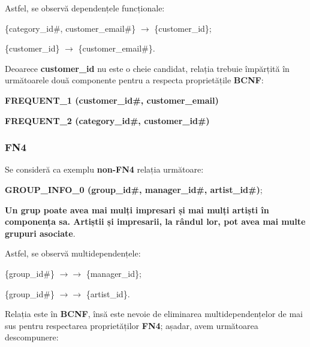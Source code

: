 \documentclass[a4paper, oneside, 12pt]{article}
\begin{document}
Astfel, se observă dependențele funcționale:

\begin{m_itemize}
        \item \{category\_id\#, customer\_email\#\} $\rightarrow$ \{customer\_id\};
        \item \{customer\_id\} $\rightarrow$ \{customer\_email\#\}.
\end{m_itemize}

Deoarece \textbf{customer\_id} nu este o cheie candidat, relația trebuie
împărțită în următoarele două componente pentru a respecta proprietățile
\textbf{BCNF}:

\begin{m_itemize}
        \item \textbf{FREQUENT\_1 (customer\_id\#, customer\_email)}
        \item \textbf{FREQUENT\_2 (category\_id\#, customer\_id\#)}
\end{m_itemize}

\subsubsection{\textbf{FN4}}

Se consideră ca exemplu \textbf{non-FN4} relația următoare:

\begin{m_itemize}[after=]
        \item \textbf{GROUP\_INFO\_0 (group\_id\#, manager\_id\#, artist\_id\#)};
        \item \textbf{Un grup poate avea mai mulți impresari și mai mulți
              artiști în componența sa. Artiștii și impresarii, la rândul
              lor, pot avea mai multe grupuri asociate}.
\end{m_itemize}


\medskip

Astfel, se observă multidependențele:

\begin{m_itemize}
        \item \{group\_id\#\} $\rightarrow\rightarrow$ \{manager\_id\};
        \item \{group\_id\#\} $\rightarrow\rightarrow$ \{artist\_id\}.
\end{m_itemize}

Relația este în \textbf{BCNF}, însă este nevoie de eliminarea
multidependențelor de mai sus pentru respectarea proprietăților \textbf{FN4};
așadar, avem următoarea descompunere:
\end{document}
